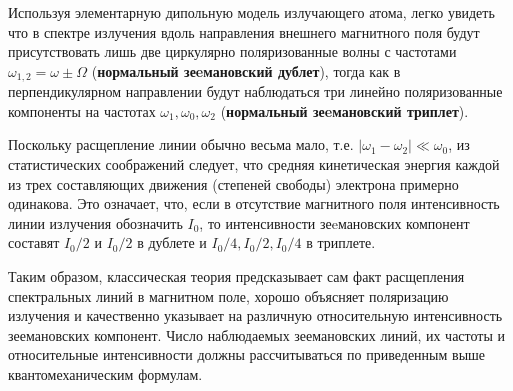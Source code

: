 Используя элементарную дипольную модель излучающего атома, легко увидеть что в спектре излучения вдоль направления внешнего магнитного поля будут присутствовать лишь две циркулярно поляризованные волны с частотами $\omega_{1,2}=\omega \pm \Omega$ (\textbf{нормальный зеeмановский дублет}), тогда как в перпендикулярном направлении будут наблюдаться три линейно поляризованные компоненты на частотах $\omega_1, \omega_0, \omega_2$ (\textbf{нормальный зеeмановский триплет}).

Поскольку расщепление линии обычно весьма мало, т.е. $|\omega_1 - \omega_2|\ll \omega_0$, из статистических соображений следует, что средняя кинетическая энергия каждой из трех составляющих движения (степеней свободы) электрона примерно одинакова. Это означает, что, если в отсутствие магнитного поля интенсивность линии излучения обозначить $I_0$, то интенсивности зеeмановских компонент составят $I_0/2$ и $I_0/2$ в дублете и $I_0/4, I_0/2, I_0/4$ в триплете. 

Таким образом, классическая теория предсказывает сам факт расщепления спектральных линий в магнитном поле, хорошо объясняет поляризацию излучения и качественно указывает на различную относительную интенсивность зеемановских компонент.
Число наблюдаемых зеемановских линий, их частоты и относительные интенсивности должны рассчитываться по приведенным выше квантомеханическим формулам.

